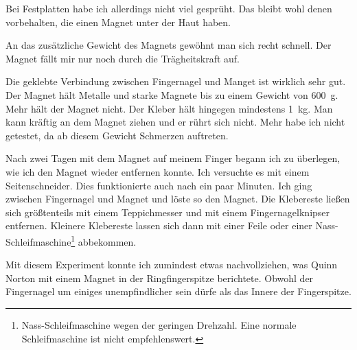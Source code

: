 Bei Festplatten habe ich allerdings nicht viel gesprüht. Das bleibt wohl denen vorbehalten, die
einen Magnet unter der Haut haben.

An das zusätzliche Gewicht des Magnets gewöhnt man sich recht schnell. Der Magnet fällt mir nur noch
durch die Trägheitskraft auf.

Die geklebte Verbindung zwischen Fingernagel und Manget ist wirklich sehr gut. Der Magnet hält
Metalle und starke Magnete bis zu einem Gewicht von \SI{600}{\gram}. Mehr hält der Magnet nicht. Der
Kleber hält hingegen mindestens \SI{1}{\kilo\gram}.
Man kann kräftig an dem Magnet ziehen und er rührt sich nicht.
Mehr habe ich nicht getestet, da ab diesem
Gewicht Schmerzen auftreten.

Nach zwei Tagen mit dem Magnet auf meinem Finger begann ich zu überlegen, wie ich den Magnet wieder
entfernen konnte. Ich versuchte es mit einem Seitenschneider. Dies funktionierte auch nach ein paar
Minuten. Ich ging zwischen Fingernagel und Magnet und löste so den Magnet. Die Klebereste ließen
sich größtenteils mit einem Teppichmesser und mit einem Fingernagelknipser entfernen.
Kleinere Klebereste lassen sich dann mit einer Feile oder einer
Nass-Schleifmaschine\footnote{Nass-Schleifmaschine wegen der geringen Drehzahl. Eine normale
Schleifmaschine ist nicht empfehlenswert.} abbekommen.

Mit diesem Experiment konnte ich zumindest etwas nachvollziehen, was Quinn Norton mit einem Magnet
in der Ringfingerspitze berichtete. Obwohl der Fingernagel um einiges unempfindlicher sein dürfe als
das Innere der Fingerspitze.
